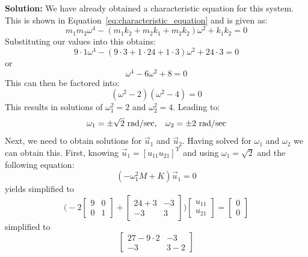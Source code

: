 \documentclass[12pt,letter]{article}
\begin{document}
\begin{example}
	
	\noindent \textbf{Solution:} We have already obtained a characteristic equation for this system. This is shown in Equation~\ref{eq:characteristic_equation} and is given as:
	\begin{equation}
	m_1 m_2 \omega^4 - (m_1 k_2 + m_2 k_1 + m_2 k_2)\omega^2 + k_1 k_2 = 0
	\end{equation}
	Substituting our values into this obtains:
	\begin{equation}
	9 \cdot 1 \omega^4 - (9 \cdot 3 + 1 \cdot 24 + 1 \cdot 3)\omega^2 + 24 \cdot 3 = 0
	\end{equation}
	or
	\begin{equation}
	\omega^4 - 6\omega^2 + 8 =0
	\end{equation}
	This can then be factored into:
	\begin{equation}
	(\omega^2-2)(\omega^2-4)=0
	\end{equation}
	This results in solutions of $\omega^2_1 = 2$ and $\omega^2_2 = 4$. Leading to:
	\begin{equation}
	\omega_1 = \pm \sqrt{2} \text{ rad/sec}, \hspace{2ex} \omega_2 = \pm 2 \text{ rad/sec}
	\end{equation}
	Next, we need to obtain solutions for $\vec{u}_1$ and $\vec{u}_2$. Having solved for $\omega_1$ and $\omega_2$ we can obtain this. First, knowing $\vec{u}_1 = [u_{11} u_{21}]^\text{T}$ and using $\omega_1 = \sqrt{2}$ and the following equation:
	\begin{equation}
		(-\omega_1^2 M  + K)\vec{u}_1 =0
	\end{equation}
	yields
	simplified to
	\begin{equation}
		 \bigg(-2\begin{bmatrix} 9 & 0 \\   0  & 1 \end{bmatrix} + \begin{bmatrix} 24+3 & -3 \\    -3  & 3 \end{bmatrix}\bigg)\begin{bmatrix} u_{11}\\ u_{21}\end{bmatrix} = \begin{bmatrix} 0\\ 0\end{bmatrix}
	\end{equation}
	simplified to
	\begin{equation}
		 \begin{bmatrix} 27-9\cdot 2 & -3 \\    -3  & 3-2 \end{bmatrix} 

\end{equation}
\end{example}
\end{document}
